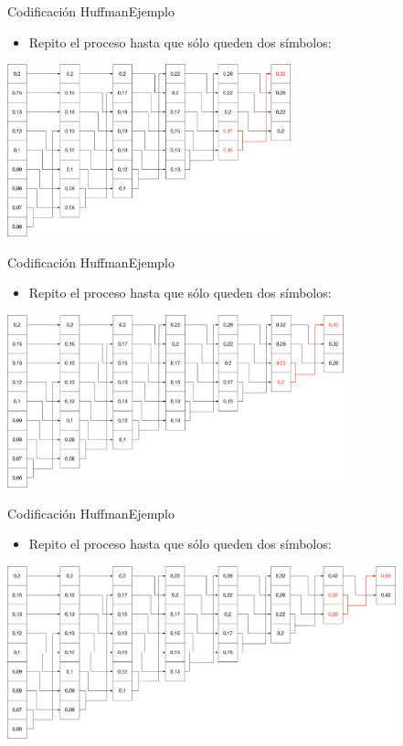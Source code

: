 \documentclass[10pt,compress]{beamer} %
\begin{document}
\begin{frame}{Codificación Huffman}{Ejemplo}
  \begin{itemize}
    \item Repito el proceso hasta que sólo queden dos símbolos:
  \end{itemize}
  \centering \includegraphics[height=5cm]{./Figuras/Huffman5.pdf}
\end{frame}

\begin{frame}{Codificación Huffman}{Ejemplo}
  \begin{itemize}
    \item Repito el proceso hasta que sólo queden dos símbolos:
  \end{itemize}
  \centering \includegraphics[height=5cm]{./Figuras/Huffman6.pdf}
\end{frame}

\begin{frame}{Codificación Huffman}{Ejemplo}
  \begin{itemize}
    \item Repito el proceso hasta que sólo queden dos símbolos:
  \end{itemize}
  \centering \includegraphics[height=5cm]{./Figuras/Huffman7.pdf}
\end{frame}
\end{document}
